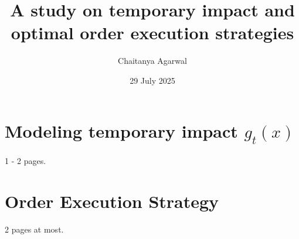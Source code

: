 \documentclass[12pt, letterpaper]{article}
\title{A study on temporary impact and optimal order execution strategies}
\author{Chaitanya Agarwal}
\date{29 July 2025}
\begin{document}
\maketitle


\section{Modeling temporary impact $g_t(x)$}

1 - 2 pages.

\section{Order Execution Strategy}

2 pages at most.
\end{document}
